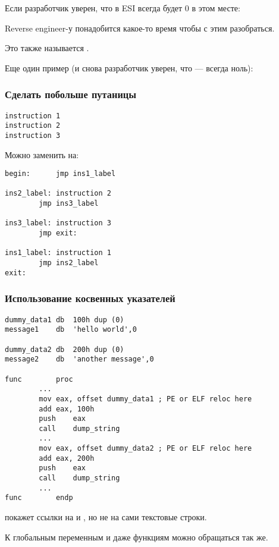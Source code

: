 Если разработчик уверен, что в ESI всегда будет 0 в этом месте:



Reverse engineer-у понадобится какое-то время чтобы с этим разобраться.

Это также называется .

Еще один пример (и снова разработчик уверен, что  --- всегда ноль):



\subsubsection{Сделать побольше путаницы}

\begin{lstlisting}
instruction 1
instruction 2
instruction 3
\end{lstlisting}

Можно заменить на:

\begin{lstlisting}[style=customasmx86]
begin:		jmp	ins1_label

ins2_label:	instruction 2
		jmp	ins3_label

ins3_label:	instruction 3
		jmp	exit:

ins1_label:	instruction 1
		jmp	ins2_label
exit:
\end{lstlisting}

\subsubsection{Использование косвенных указателей}

\begin{lstlisting}[style=customasmx86]
dummy_data1	db	100h dup (0)
message1	db	'hello world',0

dummy_data2	db	200h dup (0)
message2	db	'another message',0

func		proc
		...
		mov	eax, offset dummy_data1 ; PE or ELF reloc here
		add	eax, 100h
		push	eax
		call	dump_string
		...
		mov	eax, offset dummy_data2 ; PE or ELF reloc here
		add	eax, 200h
		push	eax
		call	dump_string
		...
func		endp
\end{lstlisting}

\IDA{} покажет ссылки на  и , но не на сами текстовые строки.

К глобальным переменным и даже функциям можно обращаться так же.

